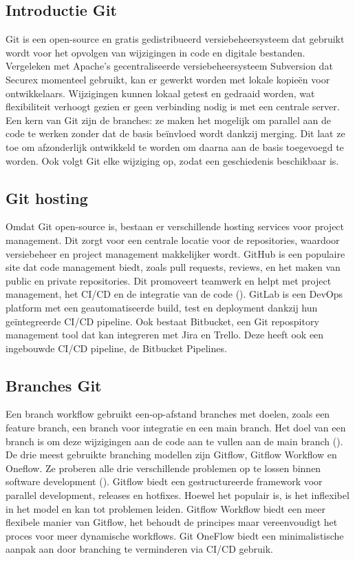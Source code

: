 \subsection{Introductie Git}
Git is een open-source en gratis gedistribueerd versiebeheersysteem dat gebruikt wordt voor het opvolgen van wijzigingen in code en digitale bestanden. Vergeleken met Apache's gecentraliseerde versiebeheersysteem Subversion dat Securex momenteel gebruikt, kan er gewerkt worden met lokale kopieën voor ontwikkelaars. Wijzigingen kunnen lokaal getest en gedraaid worden, wat flexibiliteit verhoogt gezien er geen verbinding nodig is met een centrale server. Een kern van Git zijn de branches: ze maken het mogelijk om parallel aan de code te werken zonder dat de basis beïnvloed wordt dankzij merging. Dit laat ze toe om afzonderlijk ontwikkeld te worden om daarna aan de basis toegevoegd te worden. Ook volgt Git elke wijziging op, zodat een geschiedenis beschikbaar is. 

\subsection{Git hosting}
Omdat Git open-source is, bestaan er verschillende hosting services voor project management. Dit zorgt voor een centrale locatie voor de repositories, waardoor versiebeheer en project management makkelijker wordt. GitHub is een populaire site dat code management biedt, zoals pull requests, reviews, en het maken van public en private repositories. Dit promoveert teamwerk en helpt met project management, het CI/CD en de integratie van de code (\cite{Ghodke2024}). GitLab is een DevOps platform met een geautomatiseerde build, test en deployment dankzij hun geïntegreerde CI/CD pipeline. Ook bestaat Bitbucket, een Git repospitory management tool dat kan integreren met Jira en Trello. Deze heeft ook een ingebouwde CI/CD pipeline, de Bitbucket Pipelines.

\subsection{Branches Git}
Een branch workflow gebruikt een-op-afstand branches met doelen, zoals een feature branch, een branch voor integratie en een main branch. Het doel van een branch is om deze wijzigingen aan de code aan te vullen aan de main branch (\cite{Lopes2025}).
De drie meest gebruikte branching modellen zijn Gitflow, Gitflow Workflow en Oneflow. Ze proberen alle drie verschillende problemen op te lossen binnen software development (\cite{Uppala2024}). Gitflow biedt een gestructureerde framework voor parallel development, releases en hotfixes. Hoewel het populair is, is het inflexibel in het model en kan tot problemen leiden. Gitflow Workflow biedt een meer flexibele manier van Gitflow, het behoudt de principes maar vereenvoudigt het proces voor meer dynamische workflows. Git OneFlow biedt een minimalistische aanpak aan door branching te verminderen via CI/CD gebruik.

